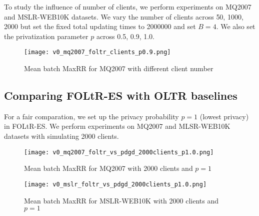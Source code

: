 To study the influence of number of clients, we perform experiments on MQ2007 and MSLR-WEB10K datasets. We vary the number of clients across {50, 1000, 2000} but set the fixed total updating times to 2000000 and set $B = 4$. We also set the privatization parameter $p$ across {0.5, 0.9, 1.0}.


\begin{figure}[H]
	\centering
	\texttt{[image: v0\_mq2007\_foltr\_clients\_p0.9.png]}
	\caption{Mean batch MaxRR for MQ2007 with different client number}
	\label{fig: mq2007clients}
\end{figure}


\subsection{Comparing FOLtR-ES with OLTR baselines}

For a fair comparation, we set up the privacy probability $p = 1$ (lowest privacy) in FOLtR-ES. We perform experiments on MQ2007 and MLSR-WEB10K datasets with simulating 2000 clients.

\begin{figure}[H]
	\centering
	\texttt{[image: v0\_mq2007\_foltr\_vs\_pdgd\_2000clients\_p1.0.png]}
	\caption{Mean batch MaxRR for MQ2007 with 2000 clients and $p = 1$}
	\label{fig: mq2007-v0-baseline}
\end{figure}

\begin{figure}[H]
	\centering
	\texttt{[image: v0\_mslr\_foltr\_vs\_pdgd\_2000clients\_p1.0.png]}
	\caption{Mean batch MaxRR for MSLR-WEB10K with 2000 clients and $p = 1$}
	\label{fig: mslr-v0-baseline}
\end{figure}

